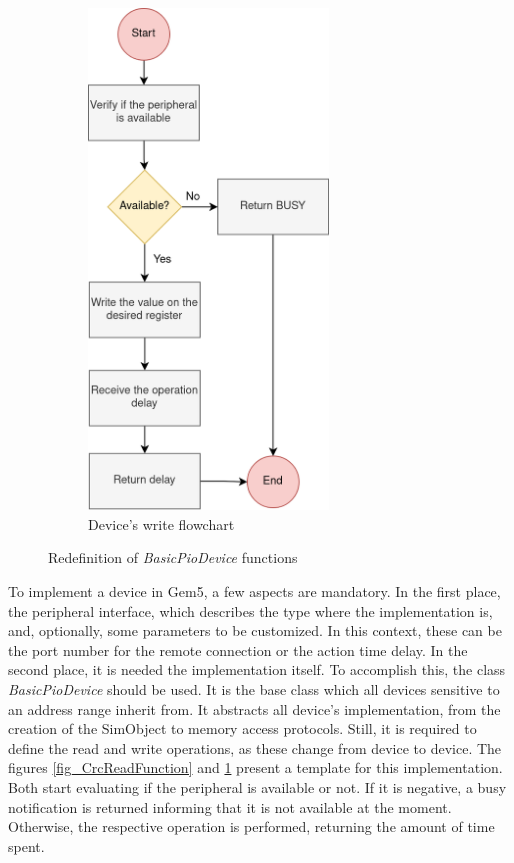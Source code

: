 \begin{figure}[t!]
\begin{subfigure}{0.4\textwidth}
		\includegraphics[width=0.7\textwidth]{Images/CrcWriteFunction.png}
		\caption[1\textwidth]{Device's write flowchart}
		\label{fig_CrcWriteFunction}
	\end{subfigure}
		
	\caption{Redefinition of \textit{BasicPioDevice} functions}
	\label{fig_Gem5ReadWrite}
\end{figure}
 
To implement a device in Gem5, a few aspects are mandatory. In the first place, the peripheral interface, which describes the type 
where the implementation is, and, optionally, some parameters to be customized. In this context, these can be
the port number for the remote connection or the action time delay. 
In the second place, it is needed the implementation itself. To accomplish this, the class \textit{BasicPioDevice} should be used. It is the base class 
which all devices sensitive to an address range inherit from. It abstracts all device's implementation, from the creation of the SimObject 
to memory access protocols. Still, it is required to define the read and write operations, as these change from device to device. 
The figures \ref{fig_CrcReadFunction} and \ref{fig_CrcWriteFunction} present a template for this implementation. Both start evaluating if
the peripheral is available or not. If it is negative, a busy notification is returned informing that it is not available at the 
moment. Otherwise, the respective operation is performed, returning the amount of time spent.

